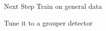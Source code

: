 \begin{frame}{Next Step}
    Train on general data 

    Tune it to a grouper detector 

\end{frame}









